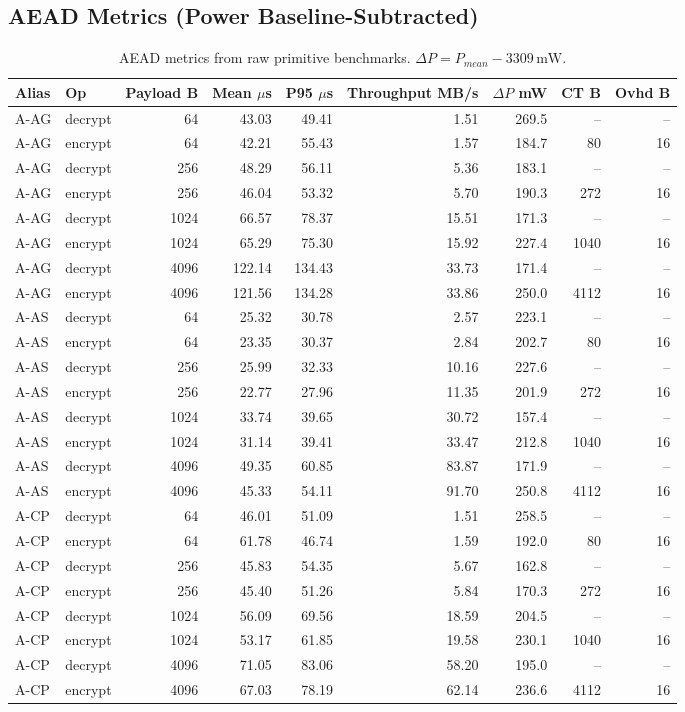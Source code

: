 \subsection{AEAD Metrics (Power Baseline-Subtracted)}
\begin{table}[t]
\centering
\caption{AEAD metrics from raw primitive benchmarks. $\Delta P = P_{mean} - 3309\,\mathrm{mW}$.}
\scriptsize
\setlength{\tabcolsep}{2.3pt}
\begin{tabular}{@{}llrrrrrrr@{}}\toprule
Alias & Op & Payload B & Mean $\mu$s & P95 $\mu$s & Throughput MB/s & $\Delta P$ mW & CT B & Ovhd B \\ \midrule
A-AG & decrypt & 64 & 43.03 & 49.41 & 1.51 & 269.5 & -- & -- \\
A-AG & encrypt & 64 & 42.21 & 55.43 & 1.57 & 184.7 & 80 & 16 \\
A-AG & decrypt & 256 & 48.29 & 56.11 & 5.36 & 183.1 & -- & -- \\
A-AG & encrypt & 256 & 46.04 & 53.32 & 5.70 & 190.3 & 272 & 16 \\
A-AG & decrypt & 1024 & 66.57 & 78.37 & 15.51 & 171.3 & -- & -- \\
A-AG & encrypt & 1024 & 65.29 & 75.30 & 15.92 & 227.4 & 1040 & 16 \\
A-AG & decrypt & 4096 & 122.14 & 134.43 & 33.73 & 171.4 & -- & -- \\
A-AG & encrypt & 4096 & 121.56 & 134.28 & 33.86 & 250.0 & 4112 & 16 \\
A-AS & decrypt & 64 & 25.32 & 30.78 & 2.57 & 223.1 & -- & -- \\
A-AS & encrypt & 64 & 23.35 & 30.37 & 2.84 & 202.7 & 80 & 16 \\
A-AS & decrypt & 256 & 25.99 & 32.33 & 10.16 & 227.6 & -- & -- \\
A-AS & encrypt & 256 & 22.77 & 27.96 & 11.35 & 201.9 & 272 & 16 \\
A-AS & decrypt & 1024 & 33.74 & 39.65 & 30.72 & 157.4 & -- & -- \\
A-AS & encrypt & 1024 & 31.14 & 39.41 & 33.47 & 212.8 & 1040 & 16 \\
A-AS & decrypt & 4096 & 49.35 & 60.85 & 83.87 & 171.9 & -- & -- \\
A-AS & encrypt & 4096 & 45.33 & 54.11 & 91.70 & 250.8 & 4112 & 16 \\
A-CP & decrypt & 64 & 46.01 & 51.09 & 1.51 & 258.5 & -- & -- \\
A-CP & encrypt & 64 & 61.78 & 46.74 & 1.59 & 192.0 & 80 & 16 \\
A-CP & decrypt & 256 & 45.83 & 54.35 & 5.67 & 162.8 & -- & -- \\
A-CP & encrypt & 256 & 45.40 & 51.26 & 5.84 & 170.3 & 272 & 16 \\
A-CP & decrypt & 1024 & 56.09 & 69.56 & 18.59 & 204.5 & -- & -- \\
A-CP & encrypt & 1024 & 53.17 & 61.85 & 19.58 & 230.1 & 1040 & 16 \\
A-CP & decrypt & 4096 & 71.05 & 83.06 & 58.20 & 195.0 & -- & -- \\
A-CP & encrypt & 4096 & 67.03 & 78.19 & 62.14 & 236.6 & 4112 & 16 \\
\bottomrule\end{tabular}
\label{tab:res-aead-manual}
\end{table}
